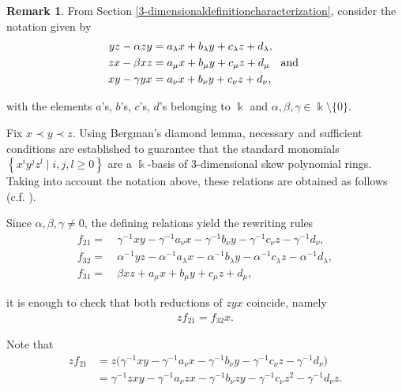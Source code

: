 \documentclass{amsart}
\theoremstyle{definition}
\newtheorem{remark}[theorem]{Remark}
\theoremstyle{remark}
\numberwithin{equation}{section}
\begin{document}
\begin{remark}\label{PBWbasis3D}
From Section \ref{3-dimensionaldefinitioncharacterization}, consider the notation given by 
\begin{align}
yz-\alpha zy & = a_{\lambda}x+b_{\lambda}y+c_{\lambda}z+d_{\lambda}, \notag \\
zx-\beta xz & = a_{\mu}x+b_{\mu}y+c_{\mu}z+d_{\mu}  \quad {\rm and}\ \label{rel3skew} \\
xy-\gamma yx & = a_{\nu}x+b_{\nu}y+c_{\nu}z+d_{\nu}, \notag
\end{align} 

with the elements $a$'s, $b$'s, $c$'s, $d$'s belonging to $\Bbbk$ and $\alpha, \beta, \gamma \in \Bbbk\setminus\{0\}$.

Fix $x\prec y\prec z$. Using Bergman's diamond lemma, necessary and sufficient conditions are established to guarantee that the standard monomials $\left\{x^iy^jz^l\mid i,j,l\ge 0\right\}$ are a $\Bbbk$-basis of 3-dimensional skew polynomial rings. Taking into account the notation above, these relations are obtained as follows (c.f. \cite[Section 5]{ReyesSuarez20173D}).

Since $\alpha,\beta,\gamma\neq 0$, the defining relations yield the rewriting rules
\begin{align*}
f_{21} = &\ \gamma^{-1}xy-\gamma^{-1}a_{\nu}x-\gamma^{-1}b_{\nu}y-\gamma^{-1}c_{\nu}z-\gamma^{-1}d_{\nu},\\
f_{32} = &\ \alpha^{-1}yz-\alpha^{-1}a_{\lambda}x-\alpha^{-1}b_{\lambda}y-\alpha^{-1}c_{\lambda}z-\alpha^{-1}d_{\lambda},\\
f_{31} = &\ \beta xz+a_{\mu}x+b_{\mu}y+c_{\mu}z+d_{\mu},
\end{align*}

it is enough to check that both reductions of $zyx$ coincide, namely
\begin{align}\label{Diamond3DBergman}
   z f_{21}=f_{32}x. 
\end{align}

Note that
\begin{align*}
z f_{21}
&=z\bigl(\gamma^{-1}xy-\gamma^{-1}a_{\nu}x-\gamma^{-1}b_{\nu}y-\gamma^{-1}c_{\nu}z-\gamma^{-1}d_{\nu}\bigr)\\
&=\gamma^{-1}zxy-\gamma^{-1}a_{\nu}zx-\gamma^{-1}b_{\nu}zy-\gamma^{-1}c_{\nu}z^2-\gamma^{-1}d_{\nu}z.
\end{align*}


\end{remark}
\end{document}
